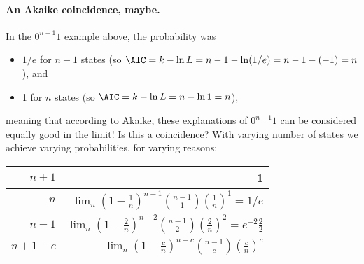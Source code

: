 		\paragraph{An Akaike coincidence, maybe.} In the $0^{n-1}1$ example above, the probability was
		\begin{itemize}
		\item $1/e$ for $n-1$ states (so $\AIC=k-\ln L=n-1-\ln(1/e)=n-1-(-1)=n$), and
		\item 1 for $n$ states (so $\AIC=k-\ln L=n-\ln 1=n$),
		\end{itemize}
		meaning that according to Akaike, these explanations of $0^{n-1}1$ can be considered equally good in the limit! Is this a coincidence?
		With varying number of states we achieve varying probabilities, for varying reasons:

		{\centering
		\begin{tabular}{| r | r|}
			\hline
			$n+1$ & 1 \\
			\hline
			$n$     & $\lim_n (1-\frac1{n})^{n-1} \binom{n-1}1 (\frac1{n})^1=1/e$\\
			\hline
			$n-1$  & $\lim_n (1-\frac2n)^{n-2} \binom{n-1}2 (\frac2n)^2=e^{-2}\frac22$\\
			\hline
			$n+1-c$ & $\lim_n (1-\frac{c}n)^{n-c} \binom{n-1}c \left(\frac{c}n\right)^c$\\
			\hline
		\end{tabular}
		}

